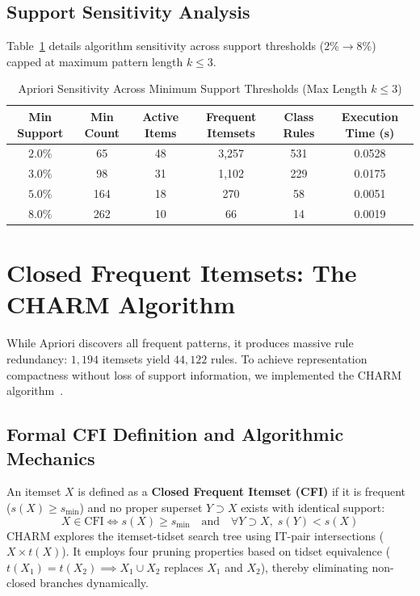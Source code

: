 \documentclass[11pt,a4paper]{article}
\begin{document}
\subsection{Support Sensitivity Analysis}
Table~\ref{tab:apriori_sensitivity} details algorithm sensitivity across support thresholds ($2\% \to 8\%$) capped at maximum pattern length $k \le 3$.

\begin{table}[H]
\centering
\small
\caption{Apriori Sensitivity Across Minimum Support Thresholds (Max Length $k \le 3$)}
\label{tab:apriori_sensitivity}
\begin{tabular}{cccccc}
\toprule
\textbf{Min Support} & \textbf{Min Count} & \textbf{Active Items} & \textbf{Frequent Itemsets} & \textbf{Class Rules} & \textbf{Execution Time (s)} \\
\midrule
$2.0\%$ & 65 & 48 & 3,257 & 531 & 0.0528 \\
$3.0\%$ & 98 & 31 & 1,102 & 229 & 0.0175 \\
$5.0\%$ & 164 & 18 & 270 & 58 & 0.0051 \\
$8.0\%$ & 262 & 10 & 66 & 14 & 0.0019 \\
\bottomrule
\end{tabular}
\end{table}

\section{Closed Frequent Itemsets: The CHARM Algorithm}
\label{sec:charm}

While Apriori discovers all frequent patterns, it produces massive rule redundancy: $1{,}194$ itemsets yield $44{,}122$ rules. To achieve representation compactness without loss of support information, we implemented the CHARM algorithm~\cite{zaki2002charm,course_lecture11}.

\subsection{Formal CFI Definition and Algorithmic Mechanics}
An itemset $X$ is defined as a \textbf{Closed Frequent Itemset (CFI)} if it is frequent ($s(X) \ge s_{\min}$) and no proper superset $Y \supset X$ exists with identical support:
\begin{equation}
X \in \text{CFI} \iff s(X) \ge s_{\min} \quad \text{and} \quad \forall Y \supset X, \; s(Y) < s(X)
\end{equation}
CHARM explores the itemset-tidset search tree using IT-pair intersections ($X \times t(X)$). It employs four pruning properties based on tidset equivalence ($t(X_1) = t(X_2) \implies X_1 \cup X_2$ replaces $X_1$ and $X_2$), thereby eliminating non-closed branches dynamically.
\end{document}

